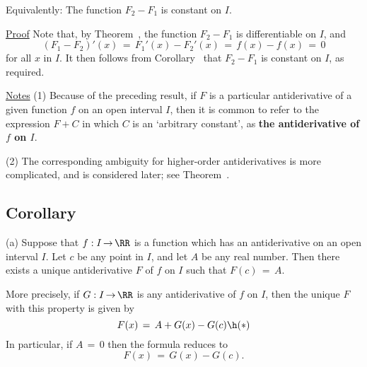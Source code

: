     Equivalently: The function $F_{2}-F_{1}$ is constant on $I$.

\V

        \underline{Proof} Note that, by Theorem~, the function $F_{2}-F_{1}$ is differentiable on $I$, and
        \begin{displaymath}
        (F_{1}-F_{2})'(x) \,=\, F_{1}'(x)-F_{2}'(x) \,=\, f(x)-f(x) \,=\, 0
        \end{displaymath}
    for all $x$ in $I$.
    It then follows from Corollary~ that $F_{2}-F_{1}$ is constant on $I$, as required. \Q

\V

        \underline{Notes} (1) Because of the preceding result, if $F$ is a particular antiderivative of a given function $f$ on an open interval $I$,
    then it is common to refer to the expression $F+C$ in which $C$ is an `arbitrary constant', 
    as {\bf the  antiderivative of $f$ on $I$}.

\V

        (2) The corresponding ambiguity for higher-order antiderivatives is more complicated, and is considered later; see Theorem~.

\VV 

             \subsection{\small{\bf Corollary}}
            \label{CorE45.60}

\V

        \hspace*{\parindent}(a) Suppose that $f:I \,{\rightarrow}\, {\RR}$ is a function which has an antiderivative on an open interval $I$.
    Let $c$ be any point in $I$, and let $A$ be any real number.
    Then there exists a unique antiderivative $F$ of $f$ on $I$ such that $F(c) \,=\, A$.

        More precisely, if $G:I \,{\rightarrow}\, {\RR}$ is any antiderivative of $f$ on $I$, then the unique $F$ with this property is given by
        \begin{displaymath}
        F(x) \,=\, A + G(x) - G(c) \h ({\ast})
        \end{displaymath}
    In particular, if $A \,=\, 0$ then the formula reduces to
        \begin{displaymath}
        F(x) \,=\, G(x)-G(c).
        \end{displaymath}

